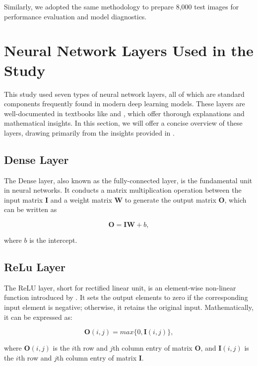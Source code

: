 \documentclass[]{interact}
\theoremstyle{plain}%
\theoremstyle{definition}
\theoremstyle{remark}
\begin{document}
Similarly, we adopted the same methodology to prepare 8,000 test images
for performance evaluation and model diagnostics.

\section{Neural Network Layers Used in the
Study}\label{neural-network-layers-used-in-the-study}

This study used seven types of neural network layers, all of which are
standard components frequently found in modern deep learning models.
These layers are well-documented in textbooks like
\citet{goodfellow2016deep} and \citet{chollet2021deep}, which offer
thorough explanations and mathematical insights. In this section, we
will offer a concise overview of these layers, drawing primarily from
the insights provided in \citet{goodfellow2016deep}.

\subsection{Dense Layer}\label{dense-layer}

The Dense layer, also known as the fully-connected layer, is the
fundamental unit in neural networks. It conducts a matrix multiplication
operation between the input matrix \(\boldsymbol{I}\) and a weight
matrix \(\boldsymbol{W}\) to generate the output matrix
\(\boldsymbol{O}\), which can be written as

\[\boldsymbol{O} = \boldsymbol{I}\boldsymbol{W} + b,\]

where \(b\) is the intercept.

\subsection{ReLu Layer}\label{relu-layer}

The ReLU layer, short for rectified linear unit, is an element-wise
non-linear function introduced by \citet{nair2010rectified}. It sets the
output elements to zero if the corresponding input element is negative;
otherwise, it retains the original input. Mathematically, it can be
expressed as:

\[\boldsymbol{O}(i,j) = max\{0, \boldsymbol{I}(i,j)\},\]

where \(\boldsymbol{O}(i,j)\) is the \(i\)th row and \(j\)th column
entry of matrix \(\boldsymbol{O}\), and \(\boldsymbol{I}(i,j)\) is the
\(i\)th row and \(j\)th column entry of matrix \(\boldsymbol{I}\).
\end{document}
